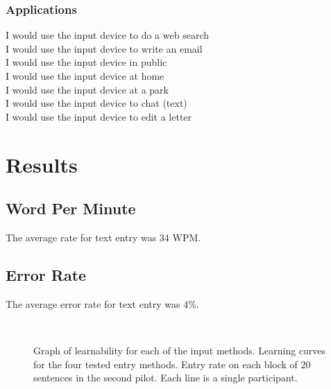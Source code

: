 \subsubsection{Applications}
I would use the input device to do a web search\\
I would use the input device to write an email\\
I would use the input device in public\\
I would use the input device at home\\
I would use the input device at a park\\
I would use the input device to chat (text)\\
I would use the input device to edit a letter

\section{Results}
\subsection{Word Per Minute}
The average rate for text entry was 34 WPM.  

\subsection{Error Rate}
The average error rate for text entry was 4\%.  

\begin{figure}
\centering



\caption{
Graph of learnability for each of the input methods.
Learning curves for the four tested entry methods.
Entry rate on each block of 20 sentences in the second pilot.
Each line is a single participant.
}~\label{fig:learnability}
\end{figure}


